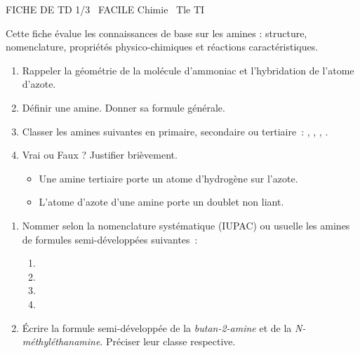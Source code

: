 \documentclass[11pt]{article}
\begin{document}
\begin{tcolorbox}[enhanced,colback=popink,colframe=popink,arc=10pt,boxrule=0pt,left=12pt,right=12pt,top=9pt,bottom=9pt]
{\color{white}\popxbold\small FICHE DE TD 1/3 \textbullet\ FACILE \hfill Chimie \textbullet\ Tle TI\par}
\end{tcolorbox}
\vspace{4pt}
Cette fiche évalue les connaissances de base sur les amines : structure, nomenclature, propriétés physico-chimiques et réactions caractéristiques.

\begin{exercice}
\begin{enumerate}
    \item Rappeler la géométrie de la molécule d'ammoniac  et l'hybridation de l'atome d'azote.
    \item Définir une amine. Donner sa formule générale.
    \item Classer les amines suivantes en primaire, secondaire ou tertiaire~:
    , , , .
    \item Vrai ou Faux ? Justifier brièvement.
    \begin{itemize}
        \item[a)] Une amine tertiaire porte un atome d'hydrogène sur l'azote.
        \item[b)] L'atome d'azote d'une amine porte un doublet non liant.
    \end{itemize}
\end{enumerate}
\end{exercice}

\begin{exercice}
\begin{enumerate}
    \item Nommer selon la nomenclature systématique (IUPAC) ou usuelle les amines de formules semi-développées suivantes~:
    \begin{enumerate}
        \item {}
        \item {}
        \item {}
        \item {}
    \end{enumerate}
    \item Écrire la formule semi-développée de la \textit{butan-2-amine} et de la \textit{N-méthyléthanamine}. Préciser leur classe respective.
\end{enumerate}
\end{exercice}
\end{document}
